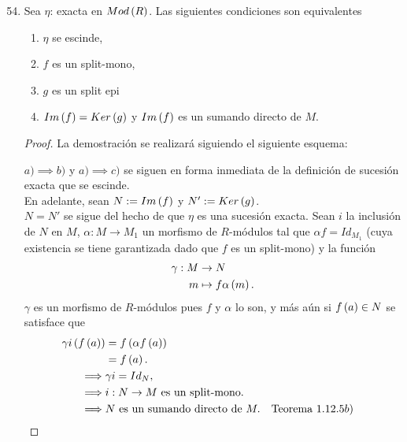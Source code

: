 \documentclass{article}
\begin{document}
	\begin{enumerate}[label=\textbf{Ej \arabic*.}]
		\setcounter{enumi}{53}
		\item Sea $\eta$:
 		exacta en $Mod\left(R\right)$. Las siguientes condiciones son equivalentes
 		\begin{enumerate}
 			\item $\eta$ se escinde,
 			\item $f$ es un split-mono,
 			\item $g$ es un split epi
 			\item $Im\left(f\right)=Ker\left(g\right)$ y $Im\left(f\right)$ es un sumando directo de $M$.
 		\end{enumerate}
 		\begin{proof}
 			La demostración se realizará siguiendo el siguiente esquema:
 			\begin{center}
 			\end{center}
 		$a)\implies b)$ y $a)\implies c)$ se siguen en forma inmediata de la definición de sucesión exacta que se escinde.\\
 		En adelante, sean $N:=Im\left(f\right)$ y $N':=Ker\left(g\right)$.\\
 		 $N=N'$ se sigue del hecho de que $\eta$ es una sucesión exacta. Sean $i$ la inclusión de $N$ en $M$, $\alpha:M\to M_1$ un morfismo de $R$-módulos tal que $\alpha f=Id_{M_1}$ (cuya existencia se tiene garantizada dado que $f$ es un split-mono) y la función
 		\begin{align*}
 			\gamma: M &\rightarrow N\\ m &\mapsto f\alpha\left(m\right).
 		\end{align*}
 		$\gamma$ es un morfismo de $R$-módulos pues $f$ y $\alpha$ lo son, y más aún si $f\left(a\right)\in N$ se satisface que
 		\begin{align*}
 			\gamma i\lrprth{f\lrprth{a}}&= f\lrprth{\alpha f\lrprth{a}}\\
 			&=f\lrprth{a}.\\
 			\implies & \gamma i=Id_N ,\\
 			\implies & i:N\to M\text{ es un split-mono.}\\
 			\implies & N\text{ es un sumando directo de }M. && \text{Teorema 1.12.5}b)

\end{align*}
\end{proof}
\end{enumerate}
\end{document}
